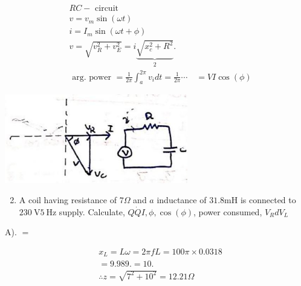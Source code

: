 \documentclass[12pt, a4paper]{article}
\newcommand{\figwidth}{8cm}
\begin{document}
	$$
		\begin{aligned}
			 & R C-\text { circuit }                                                                                        \\
			 & v=v_{m} \sin (\omega t)                                                                                      \\
			 & i=I_{m} \sin (\omega t+\phi)                                                                                 \\
			 & v=\sqrt{v_{R}^{2}+v_{E}^{2}}=i \underbrace{\sqrt{x_{c}^{2}+R^{2}}}_{2} .                                     \\
			 & \text { arg. power }=\frac{1}{2 \pi} \int_{a}^{2 \pi} v_{i} d t=\frac{1}{2 \pi} \cdots \quad=V I \cos (\phi)
		\end{aligned}
	$$

	\begin{center}
		\includegraphics[max width=\figwidth]{2024_06_15_74bbabba7981675b0d49g-07(2)}
	\end{center}

	\begin{enumerate}
		\setcounter{enumi}{1}
		\item A coil having resistance of $7 \Omega$ and $a$ inductance of $31.8 \mathrm{mH}$ is connected to $230 \mathrm{~V} 5 \mathrm{~Hz}$ supply. Calculate, $Q \dot{Q} I, \phi, \cos (\phi)$, power consumed, $V_{R} d V_{L}$
	\end{enumerate}

	A). $=$

	$$
		\begin{aligned}
			 & x_{L}=L \omega=2 \pi f L=100 \pi \times 0.0318 \\
			 & =9.989 .=10 .                                  \\
			 & \therefore z=\sqrt{7^{2}+10^{2}}=12.21 \Omega
		\end{aligned}
	$$
\end{document}
